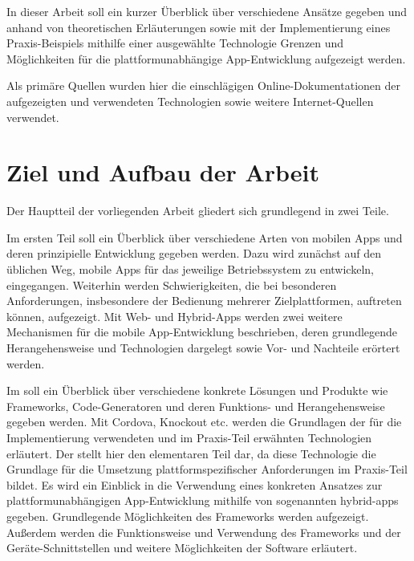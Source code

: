 In dieser Arbeit soll ein kurzer Überblick über verschiedene Ansätze gegeben und anhand von theoretischen Erläuterungen sowie mit der Implementierung eines Praxis-Beispiels mithilfe einer ausgewählte Technologie Grenzen und Möglichkeiten für die plattformunabhängige App-Entwicklung aufgezeigt werden.

	Als primäre Quellen wurden hier die einschlägigen Online-Dokumentationen der aufgezeigten und verwendeten Technologien sowie weitere Internet-Quellen verwendet. 
	
\section{Ziel und Aufbau der Arbeit}

Der Hauptteil der vorliegenden Arbeit gliedert sich grundlegend in zwei Teile.

Im ersten Teil  soll ein Überblick über verschiedene Arten von mobilen Apps und deren prinzipielle Entwicklung gegeben werden. 
Dazu wird zunächst auf den üblichen Weg, mobile Apps für das jeweilige Betriebssystem zu entwickeln, eingegangen. 
Weiterhin werden Schwierigkeiten, die bei besonderen Anforderungen, insbesondere der Bedienung mehrerer Zielplattformen, auftreten können, aufgezeigt.
Mit Web- und Hybrid-Apps werden zwei weitere Mechanismen für die mobile App-Entwicklung beschrieben, deren grundlegende Herangehensweise und Technologien dargelegt sowie Vor- und Nachteile erörtert werden.

	Im  soll ein Überblick über verschiedene konkrete Lösungen und Produkte wie Frameworks, Code-Generatoren und deren Funktions- und Herangehensweise gegeben werden.
	Mit Cordova, Knockout etc. werden die Grundlagen der für die Implementierung verwendeten und im Praxis-Teil erwähnten Technologien erläutert. 
	Der  stellt hier den elementaren Teil dar, da diese Technologie die Grundlage für die Umsetzung plattformspezifischer Anforderungen im Praxis-Teil bildet. Es wird ein Einblick in die Verwendung eines konkreten Ansatzes zur plattformunabhängigen App-Entwicklung mithilfe von sogenannten \glspl{hybrid-app} gegeben. Grundlegende Möglichkeiten des Frameworks werden aufgezeigt. Außerdem werden die Funktionsweise und Verwendung des Frameworks und der Geräte-Schnittstellen und weitere Möglichkeiten der Software erläutert.

